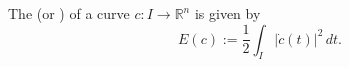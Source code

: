 The  (or ) of a curve $c: I \rightarrow \mathbb{R}^n$ is given by $$E(c) := \frac{1}{2} \int_I |\dot{c}(t)|^2 \, dt.$$
